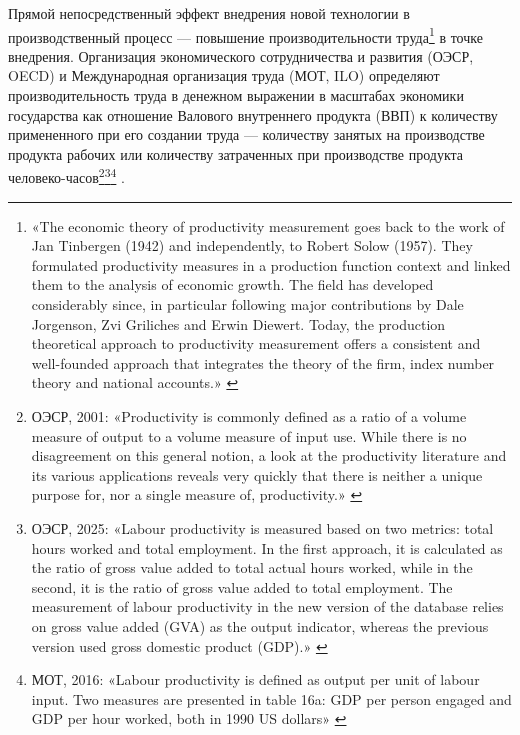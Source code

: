 \documentclass{article}
\begin{document}
Прямой непосредственный эффект внедрения новой технологии в производственный процесс — повышение производительности труда\footnote{«The economic theory of productivity measurement goes back to the work of Jan Tinbergen (1942) and independently, to Robert Solow (1957). They formulated productivity measures in a production function context and linked them to the analysis of economic growth. The field has developed considerably since, in particular following major contributions by Dale Jorgenson, Zvi Griliches and Erwin Diewert. Today, the production theoretical approach to productivity measurement offers a consistent and well-founded approach that integrates the theory of the firm, index number theory and national accounts.» \cite{oecdLabourProductivityManual2001}} в точке внедрения. Организация экономического сотрудничества и развития (ОЭСР, OECD) и Международная организация труда (МОТ, ILO) определяют производительность труда в денежном выражении в масштабах экономики государства как отношение Валового внутреннего продукта (ВВП) к количеству примененного при его создании труда — количеству занятых на производстве продукта рабочих или количеству затраченных при производстве продукта человеко-часов\footnote{ОЭСР, 2001: «Productivity is commonly defined as a ratio of a volume measure of output to a volume measure of input use. While there is no disagreement on this general notion, a look at the productivity literature and its various applications reveals very quickly that there is neither a unique purpose for, nor a single measure of, productivity.» \cite{oecdLabourProductivityManual2001}}\footnote{ОЭСР, 2025: «Labour productivity is measured based on two metrics: total hours worked and total employment. In the first approach, it is calculated as the ratio of gross value added to total actual hours worked, while in the second, it is the ratio of gross value added to total employment. The measurement of labour productivity in the new version of the database relies on gross value added (GVA) as the output indicator, whereas the previous version used gross domestic product (GDP).» \cite{oecdRevampOfProductivityDatabase2025}}\footnote{МОТ, 2016: «Labour productivity is defined as output per unit of labour input. Two measures are presented in table 16a: GDP per person engaged and GDP per hour worked, both in 1990 US dollars» \cite{iloLabourProductivityKILM2016}} \cite{oecdLabourProductivityManual2001, oecdRevampOfProductivityDatabase2025, iloLabourProductivityKILM2016}.
\end{document}
